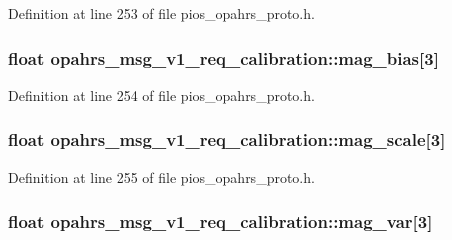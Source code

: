 Definition at line 253 of file pios\-\_\-opahrs\-\_\-proto.\-h.

\hypertarget{structopahrs__msg__v1__req__calibration_ae5044c4ba430ed823f11ae7ba0ca813e}{
\subsubsection[{mag\-\_\-bias}]{\setlength{\rightskip}{0pt plus 5cm}float opahrs\-\_\-msg\-\_\-v1\-\_\-req\-\_\-calibration\-::mag\-\_\-bias\mbox{[}3\mbox{]}}}\label{structopahrs__msg__v1__req__calibration_ae5044c4ba430ed823f11ae7ba0ca813e}


Definition at line 254 of file pios\-\_\-opahrs\-\_\-proto.\-h.

\hypertarget{structopahrs__msg__v1__req__calibration_a606d427f3b8014b8122c2a6a15c6c9ab}{
\subsubsection[{mag\-\_\-scale}]{\setlength{\rightskip}{0pt plus 5cm}float opahrs\-\_\-msg\-\_\-v1\-\_\-req\-\_\-calibration\-::mag\-\_\-scale\mbox{[}3\mbox{]}}}\label{structopahrs__msg__v1__req__calibration_a606d427f3b8014b8122c2a6a15c6c9ab}


Definition at line 255 of file pios\-\_\-opahrs\-\_\-proto.\-h.

\hypertarget{structopahrs__msg__v1__req__calibration_ac313a31071e4ab03c170151187667035}{
\subsubsection[{mag\-\_\-var}]{\setlength{\rightskip}{0pt plus 5cm}float opahrs\-\_\-msg\-\_\-v1\-\_\-req\-\_\-calibration\-::mag\-\_\-var\mbox{[}3\mbox{]}}}\label{structopahrs__msg__v1__req__calibration_ac313a31071e4ab03c170151187667035}


